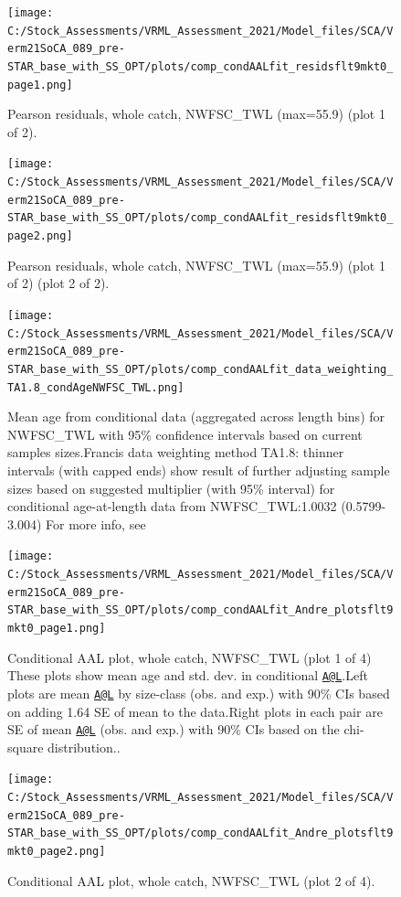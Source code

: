 \documentclass[
  english,
  a4paper,
]{article}
\begin{document}
\begin{figure}
\centering
\texttt{[image: C:/Stock\_Assessments/VRML\_Assessment\_2021/Model\_files/SCA/Verm21SoCA\_089\_pre-STAR\_base\_with\_SS\_OPT/plots/comp\_condAALfit\_residsflt9mkt0\_page1.png]}
\caption{Pearson residuals, whole catch, NWFSC\_TWL (max=55.9) (plot 1 of 2).\label{fig:comp_condAALfit_residsflt9mkt0_page1}}
\end{figure}

\begin{figure}
\centering
\texttt{[image: C:/Stock\_Assessments/VRML\_Assessment\_2021/Model\_files/SCA/Verm21SoCA\_089\_pre-STAR\_base\_with\_SS\_OPT/plots/comp\_condAALfit\_residsflt9mkt0\_page2.png]}
\caption{Pearson residuals, whole catch, NWFSC\_TWL (max=55.9) (plot 1 of 2) (plot 2 of 2).\label{fig:comp_condAALfit_residsflt9mkt0_page2}}
\end{figure}

\begin{figure}
\centering
\texttt{[image: C:/Stock\_Assessments/VRML\_Assessment\_2021/Model\_files/SCA/Verm21SoCA\_089\_pre-STAR\_base\_with\_SS\_OPT/plots/comp\_condAALfit\_data\_weighting\_TA1.8\_condAgeNWFSC\_TWL.png]}
\caption{Mean age from conditional data (aggregated across length bins) for NWFSC\_TWL with 95\% confidence intervals based on current samples sizes.Francis data weighting method TA1.8: thinner intervals (with capped ends) show result of further adjusting sample sizes based on suggested multiplier (with 95\% interval) for conditional age-at-length data from NWFSC\_TWL:1.0032 (0.5799-3.004) For more info, see}
\end{figure}

\begin{figure}
\centering
\texttt{[image: C:/Stock\_Assessments/VRML\_Assessment\_2021/Model\_files/SCA/Verm21SoCA\_089\_pre-STAR\_base\_with\_SS\_OPT/plots/comp\_condAALfit\_Andre\_plotsflt9mkt0\_page1.png]}
\caption{Conditional AAL plot, whole catch, NWFSC\_TWL (plot 1 of 4)
These plots show mean age and std. dev. in conditional \href{mailto:A@L}{\nolinkurl{A@L}}.Left plots are mean \href{mailto:A@L}{\nolinkurl{A@L}} by size-class (obs. and exp.) with 90\% CIs based on adding 1.64 SE of mean to the data.Right plots in each pair are SE of mean \href{mailto:A@L}{\nolinkurl{A@L}} (obs. and exp.) with 90\% CIs based on the chi-square distribution..\label{fig:comp_condAALfit_Andre_plotsflt9mkt0_page1}}
\end{figure}

\begin{figure}
\centering
\texttt{[image: C:/Stock\_Assessments/VRML\_Assessment\_2021/Model\_files/SCA/Verm21SoCA\_089\_pre-STAR\_base\_with\_SS\_OPT/plots/comp\_condAALfit\_Andre\_plotsflt9mkt0\_page2.png]}
\caption{Conditional AAL plot, whole catch, NWFSC\_TWL (plot 2 of 4).\label{fig:comp_condAALfit_Andre_plotsflt9mkt0_page2}}
\end{figure}
\end{document}
